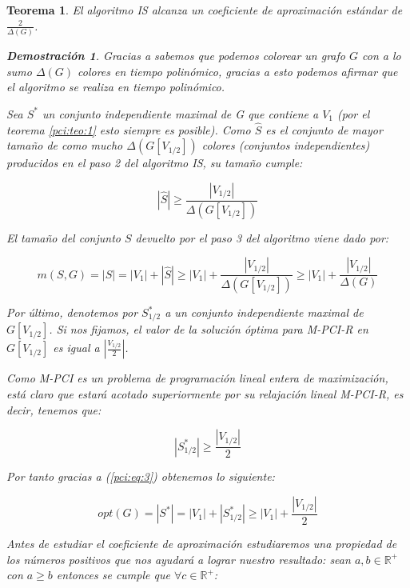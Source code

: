 \documentclass[a4paper,12pt,titlepage]{article}
\newtheorem{teo}{Teorema}[section]
\newtheorem*{dem}{\textbf{Demostraci\'on}}
\begin{document}
\begin{teo}

El algoritmo IS alcanza un coeficiente de aproximaci\'on est\'andar de $\frac{2}{\Delta(G)}$.

\begin{dem}

Gracias a \cite{max-pci4} sabemos que podemos colorear un grafo $G$ con a lo sumo $\Delta(G)$ colores en tiempo polin\'omico, gracias a esto podemos afirmar que el algoritmo se realiza en tiempo polin\'omico.

Sea $S^*$ un conjunto independiente maximal de G que contiene a $V_1$ (por el teorema \ref{pci:teo:1} esto siempre es posible). Como $\hat{S}$ es el conjunto de mayor tamaño de como mucho $\Delta(G[V_{1/2}])$ colores (conjuntos independientes) producidos en el paso 2 del algoritmo IS, su tamaño cumple:

\begin{equation} \label{pci:eq:1}
|\hat{S}| \geq \frac{|V_{1/2}|}{\Delta(G[V_{1/2}])}
\end{equation}

El tamaño del conjunto $S$ devuelto por el paso 3 del algoritmo viene dado por:

\begin{equation} \label{pci:eq:2}
m(S,G)=|S|=|V_1|+|\hat{S}| \geq |V_1| + \frac{|V_{1/2}|}{\Delta(G[V_{1/2}])}\geq |V_1| + \frac{|V_{1/2}|}{\Delta(G)}
\end{equation}

Por \'ultimo, denotemos por $S_{1/2}^{*}$ a un conjunto independiente maximal de $G[V_{1/2}]$. Si nos fijamos, el valor de la soluci\'on \'optima para M-PCI-R en $G[V_{1/2}]$ es igual a $|\frac{V_{1/2}}{2}|$.

Como M-PCI es un problema de programaci\'on lineal entera de maximizaci\'on, est\'a claro que estar\'a acotado superiormente por su relajaci\'on lineal M-PCI-R, es decir, tenemos que:

\begin{equation} \label{pci:eq:3}
|S_{1/2}^{*}| \geq \frac{|V_{1/2}|}{2}
\end{equation}

Por tanto gracias a (\ref{pci:eq:3}) obtenemos lo siguiente:

\begin{equation} \label{pci:eq:4}
opt(G) = |S^*| = |V_1| + |S_{1/2}^*| \geq |V_1| + \frac{|V_{1/2}|}{2}
\end{equation}

Antes de estudiar el coeficiente de aproximaci\'on estudiaremos una propiedad de los n\'umeros positivos que nos ayudar\'a a lograr nuestro resultado: sean $a,b \in \mathbb{R}^+$ con $a\geq b$ entonces se cumple que $\forall c \in \mathbb{R}^+$:


\end{dem}
\end{teo}
\end{document}
